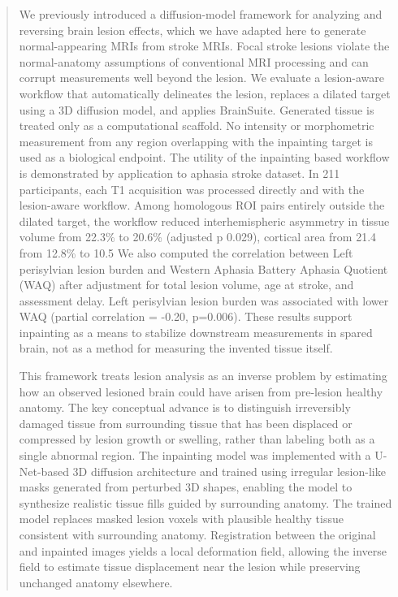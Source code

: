 \documentclass[runningheads]{llncs}
\begin{document}
\maketitle              %
%
\begin{abstract}
We previously introduced a diffusion-model framework for analyzing and reversing brain lesion effects, which we have adapted here to generate normal-appearing MRIs from stroke MRIs. 
Focal stroke lesions violate the normal-anatomy assumptions
of conventional MRI processing and can corrupt measurements well beyond
the lesion. We evaluate a lesion-aware workflow that automatically
delineates the lesion, replaces a dilated target using a 3D diffusion model,
and applies BrainSuite. Generated tissue is treated only as a computational
scaffold. No intensity or morphometric measurement from any region
overlapping with the inpainting target is used as a biological endpoint.
The utility of the inpainting based workflow is demonstrated by application to aphasia stroke dataset. 
In 211 participants, each T1 acquisition was processed directly and
with the lesion-aware workflow. Among homologous ROI pairs entirely
outside the dilated target, the workflow reduced interhemispheric asymmetry
in tissue volume from 22.3\% to 20.6\% (adjusted p 0.029),
cortical area from 21.4%
from 12.8\% to 10.5%
We also computed the correlation between Left perisylvian lesion burden and Western Aphasia Battery Aphasia Quotient (WAQ) after
adjustment for total lesion volume, age at stroke, and assessment delay. 
Left perisylvian lesion burden was
associated with lower WAQ 
(partial correlation = -0.20, p=0.006). These results support inpainting
as a means to stabilize downstream measurements in spared brain, not
as a method for measuring the invented tissue itself.

This framework treats lesion analysis as an inverse problem by estimating how an observed lesioned brain could have arisen from pre-lesion healthy anatomy. The key conceptual advance is to distinguish irreversibly damaged tissue from surrounding tissue that has been displaced or compressed by lesion growth or swelling, rather than labeling both as a single abnormal region.
The inpainting model was implemented with a U-Net-based 3D diffusion architecture and trained using irregular lesion-like masks generated from perturbed 3D shapes, enabling the model to synthesize realistic tissue fills guided by surrounding anatomy. The trained model replaces masked lesion voxels with plausible healthy tissue consistent with surrounding anatomy. Registration between the original and inpainted images yields a local deformation field, allowing the inverse field to estimate tissue displacement near the lesion while preserving unchanged anatomy elsewhere.


\end{abstract}
\end{document}
